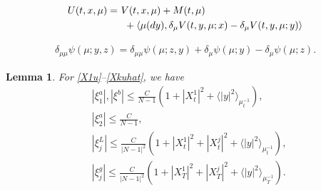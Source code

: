 \documentclass[10pt,a4paper]{amsart}
\newtheorem{lemma}{Lemma}
\begin{document}
 \begin{align}
 U(t, x, \mu)=\ &  V(t, x, \mu) + M(t, \mu) \label{defUU}   \\
   & \ + \langle \mu(dy),  \delta_\mu  V(t, y,\mu; x)- \delta_\mu  V(t, y,\mu; y)      \rangle \notag
 \end{align}

\begin{align}\label{ssp}
\delta_{\mu\mu}\psi(\mu; y,z) =\delta_{\mu\mu} \psi(\mu; z,y)
+\delta_\mu \psi(\mu;y) -\delta_\mu \psi(\mu; z).
\end{align}

\begin{lemma}\label{lemma:xi}
 For \eqref{X1u}--\eqref{Xkuhat},
we have
\begin{align}
& |\xi^a_1 |, |\xi^b|\le \frac{C}{N-1} (1+|X_t^1|^2 +\langle|y|^2\rangle_{\mu_t^{-1}}  ),   \label{xia1b}  \\
& |\xi^a_2 |\le \frac{C}{N-1} ,  \label{xia2}   \\
&|\xi_j^L|\le \frac{C}{|N-1|^2} (1+|X^1_t|^2+|X_t^j|^2+\langle|y|^2\rangle_{\mu_t^{-1}}  ),\label{xiLj}  \\
&|\xi_j^g|\le \frac{C}{|N-1|^2} (1+|X^1_T|^2+|X_T^j|^2+\langle|y|^2\rangle_{\mu_T^{-1}} ).\label{xigj}
\end{align}

\end{lemma}
\end{document}
